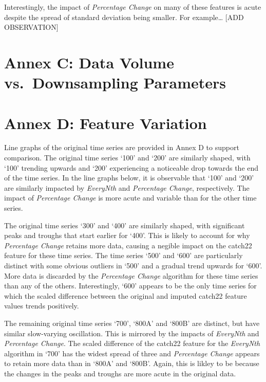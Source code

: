 \documentclass{article}
\begin{document}
Interestingly, the impact of \emph{Percentage Change} on many of these
features is acute despite the spread of standard deviation being
smaller. For example\ldots{} {[}ADD OBSERVATION{]}

\hypertarget{annex-c-data-volume-vs.-downsampling-parameters}{%
\section{Annex C: Data Volume vs.~Downsampling
Parameters}\label{annex-c-data-volume-vs.-downsampling-parameters}}

\hypertarget{annex-d-feature-variation}{%
\section{Annex D: Feature Variation}\label{annex-d-feature-variation}}

Line graphs of the original time series are provided in Annex D to
support comparison. The original time series `100' and `200' are
similarly shaped, with `100' trending upwards and `200' experiencing a
noticeable drop towards the end of the time series. In the line graphs
below, it is observable that `100' and `200' are similarly impacted by
\emph{EveryNth} and \emph{Percentage Change}, respectively. The impact
of \emph{Percentage Change} is more acute and variable than for the
other time series.

The original time series `300' and `400' are similarly shaped, with
significant peaks and troughs that start earlier for `400'. This is
likely to account for why \emph{Percentage Change} retains more data,
causing a negible impact on the catch22 feature for these time series.
The time series `500' and `600' are particularly distinct with some
obvious outliers in `500' and a gradual trend upwards for `600'. More
data is discarded by the \emph{Percentage Change} algorithm for these
time series than any of the others. Interestingly, `600' appears to be
the only time series for which the scaled difference between the
original and imputed catch22 feature values trends positively.

The remaining original time series `700', `800A' and `800B' are
distinct, but have similar slow-varying oscillation. This is mirrored by
the impacts of \emph{EveryNth} and \emph{Percentage Change}. The scaled
difference of the catch22 feature for the \emph{EveryNth} algorithm in
`700' has the widest spread of three and \emph{Percentage Change}
appears to retain more data than in `800A' and `800B'. Again, this is
likley to be because the changes in the peaks and troughs are more acute
in the original data.
\end{document}
